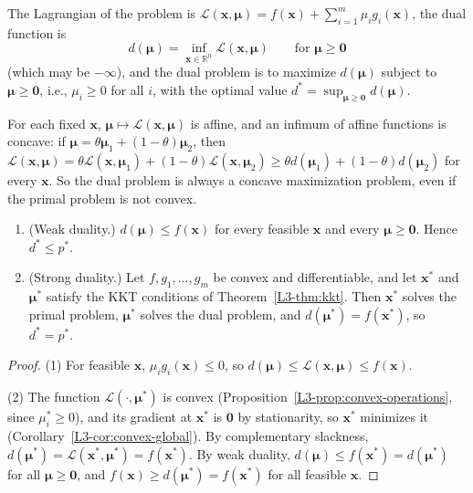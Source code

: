 \begin{definition}\label{L3-def:dual}
    The Lagrangian of the problem is $\mathcal{L}(\mathbf{x}, \boldsymbol{\mu}) = f(\mathbf{x}) + \sum_{i=1}^m \mu_ig_i(\mathbf{x})$, the dual function is
    \[d(\boldsymbol{\mu}) = \inf_{\mathbf{x} \in \mathbb{R}^n} \mathcal{L}(\mathbf{x}, \boldsymbol{\mu}) \qquad \text{for } \boldsymbol{\mu} \geq \mathbf{0}\]
    (which may be $-\infty$), and the dual problem is to maximize $d(\boldsymbol{\mu})$ subject to $\boldsymbol{\mu} \geq \mathbf{0}$, i.e., $\mu_i \geq 0$ for all $i$, with the optimal value $d^* = \sup_{\boldsymbol{\mu} \geq \mathbf{0}} d(\boldsymbol{\mu})$.
\end{definition}

For each fixed $\mathbf{x}$, $\boldsymbol{\mu} \mapsto \mathcal{L}(\mathbf{x}, \boldsymbol{\mu})$ is affine, and an infimum of affine functions is concave: if $\boldsymbol{\mu} = \theta\boldsymbol{\mu}_1 + (1 - \theta)\boldsymbol{\mu}_2$, then $\mathcal{L}(\mathbf{x}, \boldsymbol{\mu}) = \theta\mathcal{L}(\mathbf{x}, \boldsymbol{\mu}_1) + (1 - \theta)\mathcal{L}(\mathbf{x}, \boldsymbol{\mu}_2) \geq \theta d(\boldsymbol{\mu}_1) + (1 - \theta)d(\boldsymbol{\mu}_2)$ for every $\mathbf{x}$. So the dual problem is always a concave maximization problem, even if the primal problem is not convex.

\begin{theorem}\label{L3-thm:duality}
    \begin{enumerate}
        \item (Weak duality.) $d(\boldsymbol{\mu}) \leq f(\mathbf{x})$ for every feasible $\mathbf{x}$ and every $\boldsymbol{\mu} \geq \mathbf{0}$. Hence $d^* \leq p^*$.
        \item (Strong duality.) Let $f, g_1, \ldots, g_m$ be convex and differentiable, and let $\mathbf{x}^*$ and $\boldsymbol{\mu}^*$ satisfy the KKT conditions of Theorem~\ref{L3-thm:kkt}. Then $\mathbf{x}^*$ solves the primal problem, $\boldsymbol{\mu}^*$ solves the dual problem, and $d(\boldsymbol{\mu}^*) = f(\mathbf{x}^*)$, so $d^* = p^*$.
    \end{enumerate}
\end{theorem}

\begin{proof}
    (1) For feasible $\mathbf{x}$, $\mu_ig_i(\mathbf{x}) \leq 0$, so $d(\boldsymbol{\mu}) \leq \mathcal{L}(\mathbf{x}, \boldsymbol{\mu}) \leq f(\mathbf{x})$.

    (2) The function $\mathcal{L}(\cdot, \boldsymbol{\mu}^*)$ is convex (Proposition~\ref{L3-prop:convex-operations}, since $\mu_i^* \geq 0$), and its gradient at $\mathbf{x}^*$ is $\mathbf{0}$ by stationarity, so $\mathbf{x}^*$ minimizes it (Corollary~\ref{L3-cor:convex-global}). By complementary slackness, $d(\boldsymbol{\mu}^*) = \mathcal{L}(\mathbf{x}^*, \boldsymbol{\mu}^*) = f(\mathbf{x}^*)$. By weak duality, $d(\boldsymbol{\mu}) \leq f(\mathbf{x}^*) = d(\boldsymbol{\mu}^*)$ for all $\boldsymbol{\mu} \geq \mathbf{0}$, and $f(\mathbf{x}) \geq d(\boldsymbol{\mu}^*) = f(\mathbf{x}^*)$ for all feasible $\mathbf{x}$.
\end{proof}

